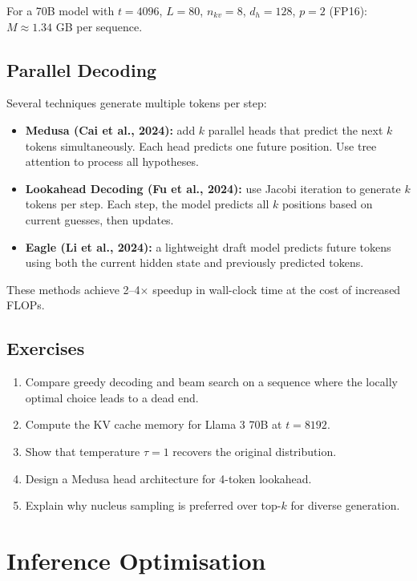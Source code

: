 \documentclass[11pt,a4paper]{book}
\theoremstyle{definition}
\begin{document}
For a 70B model with $t = 4096$, $L=80$, $n_{kv}=8$, $d_h=128$, $p=2$ (FP16): $M \approx 1.34$ GB per sequence.

\section{Parallel Decoding}

Several techniques generate multiple tokens per step:

\begin{itemize}
	\item \textbf{Medusa (Cai et al., 2024):} add $k$ parallel heads that predict the next $k$ tokens simultaneously. Each head predicts one future position. Use tree attention to process all hypotheses.
	\item \textbf{Lookahead Decoding (Fu et al., 2024):} use Jacobi iteration to generate $k$ tokens per step. Each step, the model predicts all $k$ positions based on current guesses, then updates.
	\item \textbf{Eagle (Li et al., 2024):} a lightweight draft model predicts future tokens using both the current hidden state and previously predicted tokens.
\end{itemize}

These methods achieve 2--4$\times$ speedup in wall-clock time at the cost of increased FLOPs.

\section{Exercises}

\begin{enumerate}
	\item Compare greedy decoding and beam search on a sequence where the locally optimal choice leads to a dead end.
	\item Compute the KV cache memory for Llama 3 70B at $t = 8192$.
	\item Show that temperature $\tau = 1$ recovers the original distribution.
	\item Design a Medusa head architecture for 4-token lookahead.
	\item Explain why nucleus sampling is preferred over top-$k$ for diverse generation.
\end{enumerate}

\chapter{Inference Optimisation}
\label{ch:inference-opt}
\end{document}
